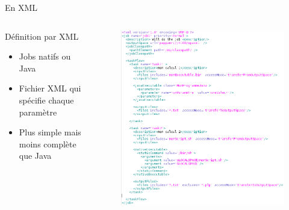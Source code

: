 \documentclass{beamer}
\begin{document}
\begin{frame}{En XML}
	\begin{columns}
	\begin{column}[l]{0.4\linewidth}
        \begin{exampleblock}{Définition par XML}
            \begin{itemize}
                \item Jobs natifs ou Java
                \item Fichier XML qui spécifie chaque paramètre
                \item Plus simple mais moins complète que Java
            \end{itemize}
        \end{exampleblock}
	\end{column}
	\begin{column}[r]{0.6\linewidth}
        \vspace{-1cm}
        \begin{figure}
            \centering
            \includegraphics[scale=0.27]{jobxml.png}
        \end{figure}
	\end{column}
	\end{columns}
    
\end{frame}
\end{document}
